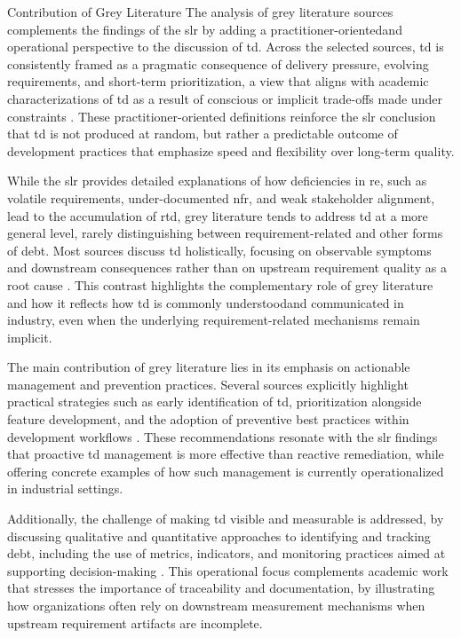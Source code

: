 \documentclass[12pt,reqno, twoside]{amsbook}
\makeatletter
\def\subsection{\@startsection{subsection}{2}%
      \z@{.5\linespacing\@plus.7\linespacing}{.25\linespacing}%
      {\normalfont\bfseries\flushleft}}
\theoremstyle{plain}
\numberwithin{equation}{chapter}
\numberwithin{section}{chapter}
\makeatother
\begin{document}
\FloatBarrier

\subsection{Contribution of Grey Literature}
The analysis of grey literature sources complements the findings of the \gls{slr} by adding a practitioner-orientedand operational perspective to the discussion of \gls{td}. 
Across the selected sources, \gls{td} is consistently framed as a pragmatic consequence of delivery pressure, evolving requirements, and short-term prioritization, a view 
that aligns with academic characterizations of \gls{td} as a result of conscious or implicit trade-offs made under constraints \parencite{Atlassian,Github2024,Confluent}.
These practitioner-oriented definitions reinforce the \gls{slr} conclusion that \gls{td} is not produced at random, but rather a predictable outcome of development practices 
that emphasize speed and flexibility over long-term quality.

While the \gls{slr} provides detailed explanations of how deficiencies in \gls{re}, such as volatile requirements,
under-documented \gls{nfr}, and weak stakeholder alignment, lead to the accumulation of \gls{rtd}, grey literature tends to address \gls{td} at a more general level, 
rarely distinguishing between requirement-related and other forms of debt. Most sources discuss \gls{td} holistically, focusing on observable symptoms and downstream 
consequences rather than on upstream requirement quality as a root cause \parencite{GeeksForGeeks, Coursera2024, Sonarsource}. This contrast highlights the complementary 
role of grey literature and how it reflects how \gls{td} is commonly understoodand communicated in industry, even when the underlying requirement-related mechanisms remain 
implicit.

The main contribution of grey literature lies in its emphasis on actionable management and prevention practices. Several sources explicitly highlight practical strategies 
such as early identification of \gls{td}, prioritization alongside feature development, and the adoption of preventive best practices within development workflows 
\parencite{Mendix2024,Mitton2023}. These recommendations resonate with the \gls{slr} findings that proactive \gls{td} management is more effective than reactive remediation, 
while offering concrete examples of how such management is currently operationalized in industrial settings.

Additionally, the challenge of making \gls{td} visible and measurable is addressed, by discussing qualitative and quantitative approaches to identifying and tracking debt, 
including the use of metrics, indicators, and monitoring practices aimed at supporting decision-making \parencite{Islam2024, Jain2025}. This operational focus complements 
academic work that stresses the importance of traceability and documentation, by illustrating how organizations often rely on downstream measurement mechanisms when upstream 
requirement artifacts are incomplete.
\end{document}
